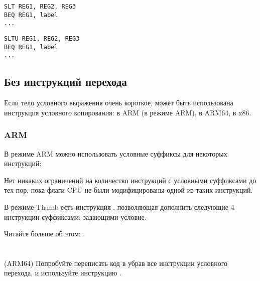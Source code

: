 \begin{lstlisting}[caption=Проверка на меньше{,} больше (знаковое)]
SLT REG1, REG2, REG3
BEQ REG1, label
...
\end{lstlisting}

\begin{lstlisting}[caption=Проверка на меньше{,} больше (беззнаковое)]
SLTU REG1, REG2, REG3
BEQ REG1, label
...
\end{lstlisting}
\fi

\subsection{Без инструкций перехода}


Если тело условного выражения очень короткое, может быть
использована инструкция условного копирования:  в ARM (в режиме ARM),  в ARM64,  в x86.

\ifdefined\IncludeARM
\subsubsection{ARM}

В режиме ARM можно использовать условные суффиксы для некоторых инструкций:




Нет никаких ограничений на количество инструкций с условными суффиксами до тех пор,
пока флаги CPU не были модифицированы одной из таких инструкций.


В режиме Thumb есть инструкция , позволяющая дополнить следующие 4 инструкции суффиксами, задающими
условие.

Читайте больше об этом: .


\fi

\ifdefined\IncludeExercises
\section{\Exercise}

(ARM64) Попробуйте переписать код в  
убрав все инструкции условного перехода, и используйте инструкцию .
\fi

